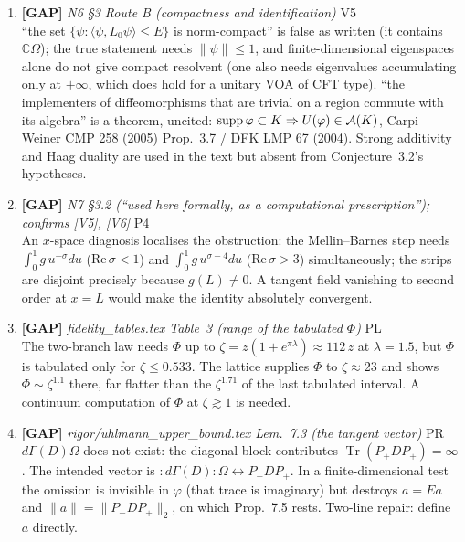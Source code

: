 \documentclass[11pt]{article}
\begin{document}
\begin{enumerate}[leftmargin=1.6em,itemsep=6pt]
\item \textbf{[GAP]} \emph{N6 \S3 Route B (compactness and identification)} \hfill\textsc{V5}\\ ``the set \(\{\psi:\langle\psi,L_0\psi\rangle\le E\}\) is norm-compact'' is false as written (it contains \(\mathbb C\Omega\)); the true statement needs \(\|\psi\|\le1\), and finite-dimensional eigenspaces alone do not give compact resolvent (one also needs eigenvalues accumulating only at \(+\infty\), which does hold for a unitary VOA of CFT type). ``the implementers of diffeomorphisms that are trivial on a region commute with its algebra'' is a theorem, uncited: \(\mathrm{supp}\,\varphi\subset K\Rightarrow U(\varphi)\in\mathcal A(K)\), Carpi--Weiner CMP 258 (2005) Prop.~3.7 / DFK LMP 67 (2004). Strong additivity and Haag duality are used in the text but absent from Conjecture~3.2's hypotheses.
\item \textbf{[GAP]} \emph{N7 \S3.2 (``used here formally, as a computational prescription''); confirms [V5], [V6]} \hfill\textsc{P4}\\ An \(x\)-space diagnosis localises the obstruction: the Mellin--Barnes step needs \(\int_0^1 g\,u^{-\sigma}du\) (\(\mathrm{Re}\,\sigma<1\)) and \(\int_0^1 g\,u^{\sigma-4}du\) (\(\mathrm{Re}\,\sigma>3\)) simultaneously; the strips are disjoint precisely because \(g(L)\neq0\). A tangent field vanishing to second order at \(x=L\) would make the identity absolutely convergent.
\item \textbf{[GAP]} \emph{fidelity\_tables.tex Table~3 (range of the tabulated \(\Phi\))} \hfill\textsc{PL}\\ The two-branch law needs \(\Phi\) up to \(\zeta=z(1+e^{\pi\lambda})\approx112\,z\) at \(\lambda=1.5\), but \(\Phi\) is tabulated only for \(\zeta\le0.533\). The lattice supplies \(\Phi\) to \(\zeta\approx23\) and shows \(\Phi\sim\zeta^{1.1}\) there, far flatter than the \(\zeta^{1.71}\) of the last tabulated interval. A continuum computation of \(\Phi\) at \(\zeta\gtrsim1\) is needed.
\item \textbf{[GAP]} \emph{rigor/uhlmann\_upper\_bound.tex Lem.~7.3 (the tangent vector)} \hfill\textsc{PR}\\ \(d\Gamma(D)\Omega\) does not exist: the diagonal block contributes \(\operatorname{Tr}(P_+DP_+)=\infty\). The intended vector is \(:\!d\Gamma(D)\!:\Omega\leftrightarrow P_-DP_+\). In a finite-dimensional test the omission is invisible in \(\varphi\) (that trace is imaginary) but destroys \(a=Ea\) and \(\|a\|=\|P_-DP_+\|_2\), on which Prop.~7.5 rests. Two-line repair: define \(a\) directly.

\end{enumerate}
\end{document}
